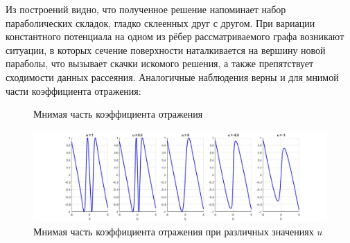 \documentclass[a4 paper, 12 pt]{extarticle}
\begin{document}
   Из построений видно, что полученное решение напоминает набор параболических складок, гладко склеенных друг с другом. 
   При вариации константного потенциала на одном из рёбер рассматриваемого графа возникают ситуации, в которых сечение поверхности наталкивается на вершину новой параболы, что вызывает скачки искомого решения, а также препятствует сходимости данных рассеяния.
   Аналогичные наблюдения верны и для мнимой части коэффициента отражения:

   \begin{figure}[!htb]
   	\begin{minipage}[h]{0.49\linewidth}
   	\end{minipage}
   	\begin{minipage}[h]{0.49\linewidth}
   	\end{minipage}
   	\caption{Мнимая часть коэффициента отражения}
   	\label{fig:imag}
   \end{figure}

   \begin{figure}[!htb]
   	\centering
   	\includegraphics[scale=0.35]{imag.jpg}
   	\caption{Мнимая часть коэффициента отражения при различных значениях $u$}
   \end{figure}
\end{document}
